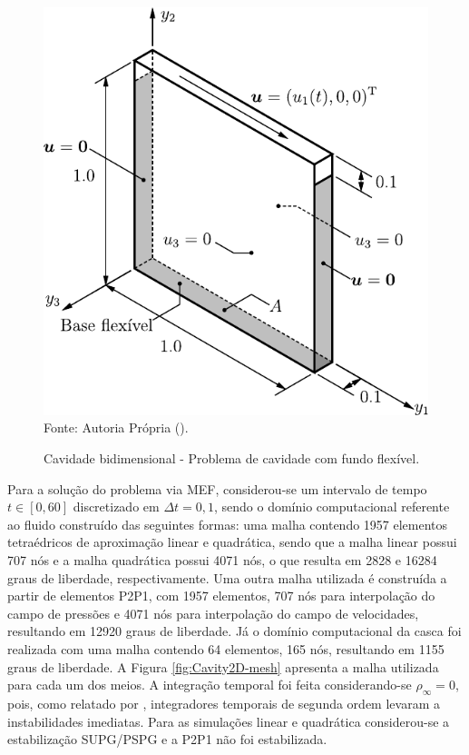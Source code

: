 \begin{figure}[h!]
    \centering
    \caption{Cavidade bidimensional - Problema de cavidade com fundo flexível.}
    \includegraphics[width=0.5\linewidth]{Figuras/FSI-Cavity2D/FSI-Cavity2D.pdf}
    \\Fonte: Autoria Própria (\the\year).
    \label{fig:cavity2D}
\end{figure}

Para a solução do problema via MEF, considerou-se um intervalo de tempo $t\in[0,60]$ discretizado em $\Delta t=0,1$, sendo o domínio computacional referente ao fluido construído das seguintes formas: uma malha contendo 1957 elementos tetraédricos de aproximação linear e quadrática, sendo que a malha linear possui 707 nós e a malha quadrática possui 4071 nós, o que resulta em 2828 e 16284 graus de liberdade, respectivamente. Uma outra malha utilizada é construída a partir de elementos P2P1, com 1957 elementos, 707 nós para interpolação do campo de pressões e 4071 nós para interpolação do campo de velocidades, resultando em 12920 graus de liberdade. Já o domínio computacional da casca foi realizada com uma malha contendo 64 elementos, 165 nós, resultando em 1155 graus de liberdade. A Figura \ref{fig:Cavity2D-mesh} apresenta a malha utilizada para cada um dos meios. A integração temporal foi feita considerando-se $\rho_\infty=0$, pois, como relatado por , integradores temporais de segunda ordem levaram a instabilidades imediatas. Para as simulações linear e quadrática considerou-se a estabilização SUPG/PSPG e a P2P1 não foi estabilizada.

